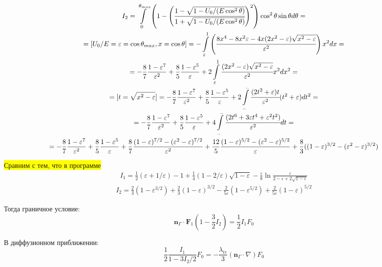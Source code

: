 \documentclass[a4paper,12pt]{article} %
\renewcommand{\vec}[1]{\bm{#1}}
\newcommand{\eps}{\varepsilon}
\begin{document}
\begin{equation}
\begin{gathered}
    I_2 =
    \int\limits_{0}^{\theta_{max}}
    \left(1 - \Bigg(\cfrac{1 - \sqrt{1 - U_0/(E  \cos^2 \theta)}}{1 + \sqrt{1 - U_0/(E  \cos^2 \theta)}}\Bigg)^2\right) \cos^2 \theta \sin \theta d\theta = \\
    = [U_0/E = \eps = \cos \theta_{max}, x = \cos \theta] =
    -\int\limits_{\eps}^{1}\left(\cfrac{8x^4 - 8 x^2 \eps - 4 x (2 x^2 - \eps) \sqrt{x^2 - \eps}}{\eps^2}\right) x^2 dx
    = \\ =
    - \frac{8}{7} \frac{1 - \eps^7}{\eps^2}
    + \frac{8}{5} \frac{1 - \eps^5}{\eps}
    + 2 \int\limits_{\eps}^{1}
    \cfrac{(2 x^2 - \eps) \sqrt{x^2 - \eps}}{\eps^2} x^2 dx^2 = \\ =
    [t = \sqrt{x^2 - \eps}] =
    - \frac{8}{7} \frac{1 - \eps^7}{\eps^2}
    + \frac{8}{5} \frac{1 - \eps^5}{\eps}
    + 2 \int\limits_{..}^{..}
    \cfrac{(2 t^2 + \eps) t}{\eps^2} (t^2 + \eps) dt^2 = \\ =
    - \frac{8}{7} \frac{1 - \eps^7}{\eps^2}
    + \frac{8}{5} \frac{1 - \eps^5}{\eps}
    + 4 \int\limits_{..}^{..}
    \cfrac{(2 t^6 + 3 \eps t^4 + \eps^2 t^2)}{\eps^2}  dt= \\ =
    - \frac{8}{7} \frac{1 - \eps^7}{\eps^2}
    + \frac{8}{5} \frac{1 - \eps^5}{\eps}
    + \frac{8}{7} \frac{(1 - \eps)^{7/2} - (\eps^2 - \eps)^{7/2}}{\eps^2}
    + \frac{12}{5} \frac{(1 - \eps)^{5/2} - (\eps^2 - \eps)^{5/2}}{\eps}
    + \frac{8}{3} ((1 - \eps)^{3/2} - (\eps^2 - \eps)^{3/2})
\end{gathered}
\end{equation}

\colorbox{yellow}{Сравним с тем, что в программе}
\begin{gather*}
I_1 =
\frac{1}{2} (\eps + 1/\eps) - 1 +
\frac{1}{4} (1 - 2/\eps)\sqrt{1 - \eps} -
\frac{\eps}{8} \ln \frac{\eps}{2 - \eps + 2 \sqrt{1 - \eps}}
\end{gather*}
\begin{gather*}
I_2 =
\frac{2}{3} (1 -\eps^{3/2})
+ \frac{2}{3} (1 -\eps)^{3/2}
- \frac{2}{5 \eps} (1 -\eps^{5/2})
+ \frac{2}{5 \eps} (1 -\eps)^{5/2}
\end{gather*}

Тогда граничное условие:
\begin{equation}
    \vec{n}_\Gamma \cdot \vec{F}_1 \left(1 - \frac{3}{2} I_2 \right) = \frac{1}{2} I_1 F_0
\end{equation}

В диффузионном приближении:
\begin{equation}
    \frac{1}{2} \frac{I_1}{1 - 3 I_2/2} F_0 = -\frac{\lambda_{tr}}{3}
    (\vec{n}_\Gamma \cdot \nabla) F_0
\end{equation}
\end{document}
